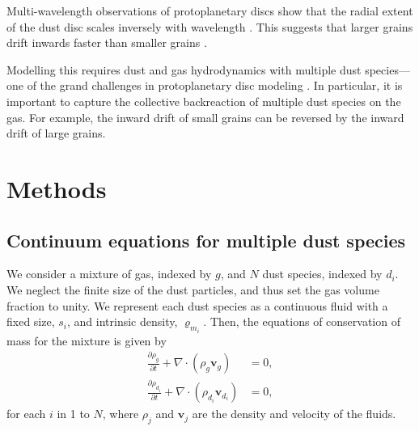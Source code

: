\documentclass[fleqn,usenatbib]{mnras}
\let\vec\mathbf
\begin{document}
Multi-wavelength observations of protoplanetary discs show that the radial
extent of the dust disc scales inversely with wavelength
\citep{Andrews2015PASP..127..961A}. This suggests that larger grains drift
inwards faster than smaller grains \citep{Weidenschilling1977MNRAS.180...57W}.

Modelling this requires dust and gas hydrodynamics with multiple dust
species---one of the grand challenges in protoplanetary disc modeling
\citep{Haworth2016PASA...33...53H}. In particular, it is important to capture
the collective backreaction of multiple dust species on the gas. For example,
the inward drift of small grains can be reversed by the inward drift of large
grains.

\section{Methods}

\subsection{Continuum equations for multiple dust species}

We consider a mixture of gas, indexed by \(g\), and \(N\) dust species, indexed
by \(d_i\). We neglect the finite size of the dust particles, and thus set the
gas volume fraction to unity. We represent each dust species as a continuous
fluid with a fixed size, \(s_i\), and intrinsic density, \(\varrho_{m_i}\).
Then, the equations of conservation of mass for the mixture is given by
%
\begin{align}
   \label{eqn:conserve-gas-mass}
   \frac{\partial \rho_g}{\partial t} + \nabla \cdot (\rho_g \vec{v}_g) &= 0, \\
   \label{eqn:conserve-dust-mass}
   \frac{\partial \rho_{d_i}}{\partial t} + \nabla \cdot (\rho_{d_i} \vec{v}_{d_i}) &= 0,
\end{align}
%
for each \(i\) in 1 to \(N\), where \(\rho_j\) and \(\vec{v}_j\) are the density
and velocity of the fluids.
\end{document}
